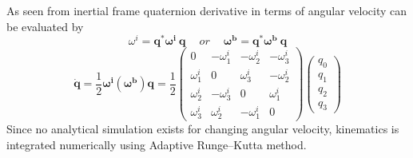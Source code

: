 As seen from inertial frame quaternion derivative in terms of angular velocity can be evaluated by
\begin{equation*}
\omega^i =\mathbf{q}^{*}\mathbf{\omega^i \ q} \ \quad or\ \mathbf{\quad \omega^b } =\mathbf{q}^{*}\mathbf{\omega^b \ q}
\end{equation*}
\begin{equation}
\dot{\mathbf{q}} =\frac{1}{2}\mathbf{\omega^i }(\mathbf{\omega^b })\mathbf{q} =\frac{1}{2}\begin{pmatrix}
0 & -\omega^i_{1} & -\omega^i_{2} & -\omega^i_{3}\\
\omega^i_{1} & 0 & \omega^i_{3} & -\omega^i_{2}\\
\omega^i_{2} & -\omega^i_{3} & 0 & \omega^i_{1}\\
\omega^i_{3} & \omega^i_{2} & -\omega^i_{1} & 0
\end{pmatrix}\begin{pmatrix}
q_{0}\\
q_{1}\\
q_{2}\\
q_{3}
\end{pmatrix}
\end{equation}
Since no analytical simulation exists for changing angular velocity, kinematics is integrated numerically using Adaptive Runge–Kutta method.
 